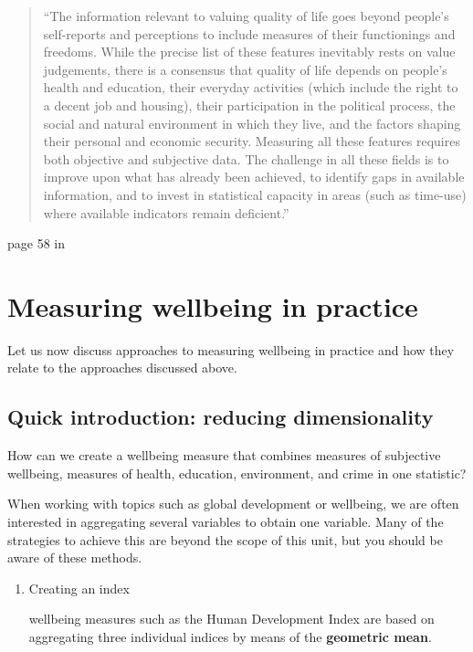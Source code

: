 \documentclass[
]{book}
\begin{document}
\begin{quote}
``The information relevant to valuing quality of life goes beyond people's self-reports and perceptions to include measures of their functionings and freedoms. While the precise list of these features inevitably rests on value judgements, there is a consensus that quality of life depends on people's health and education, their everyday activities (which include the right to a decent job and housing), their participation in the political process, the social and natural
environment in which they live, and the factors shaping their personal and economic security. Measuring all these features requires both objective and subjective data. The challenge in all these fields is to improve upon what has already been achieved, to identify gaps in available information, and to invest in statistical capacity in areas (such as time-use) where available indicators remain deficient.''
\end{quote}

page 58 in \citep{stiglitz2010report}

\hypertarget{measuring-wellbeing-in-practice}{%
\section{Measuring wellbeing in practice}\label{measuring-wellbeing-in-practice}}

Let us now discuss approaches to measuring wellbeing in practice and how they relate to the approaches discussed above.

\hypertarget{quick-introduction-reducing-dimensionality}{%
\subsection*{Quick introduction: reducing dimensionality}\label{quick-introduction-reducing-dimensionality}}

How can we create a wellbeing measure that combines measures of subjective wellbeing, measures of health, education, environment, and crime in one statistic?

When working with topics such as global development or wellbeing, we are often interested in aggregating several variables to obtain one variable. Many of the strategies to achieve this are beyond the scope of this unit, but you should be aware of these methods.

\begin{enumerate}
\def\labelenumi{\arabic{enumi}.}
\item
  Creating an index

  wellbeing measures such as the Human Development Index are based on aggregating three individual indices by means of the \textbf{geometric mean}.
\end{enumerate}
\end{document}
